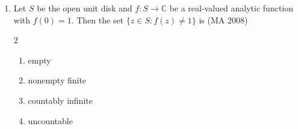 \begin{enumerate}[label=\thesubsection.\arabic*,ref=\thesubsection.\theenumi]
\item Let \(S\) be the open unit disk and \(f: S \to \mathbb{C}\) be a real-valued analytic function with \(f(0) = 1\). Then the set \(\{z \in S: f(z) \neq 1\}\) is
\hfill (MA 2008)
\begin{multicols}{2}
\begin{enumerate}
\item empty
\item nonempty finite
\item countably infinite
\item uncountable
\end{enumerate}
\end{multicols}
\end{enumerate}

